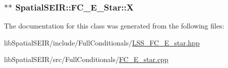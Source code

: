 \hypertarget{classSpatialSEIR_1_1FC__E__Star_adbf6bb013ffffb641ab5bf08a86543d1}{
\subsubsection[{X}]{$\ast$$\ast$ Spatial\-S\-E\-I\-R\-::\-F\-C\-\_\-\-E\-\_\-\-Star\-::\-X}}\label{classSpatialSEIR_1_1FC__E__Star_adbf6bb013ffffb641ab5bf08a86543d1}


The documentation for this class was generated from the following files\-:\begin{DoxyCompactItemize}
\item 
lib\-Spatial\-S\-E\-I\-R/include/\-Full\-Conditionals/\hyperlink{LSS__FC__E__star_8hpp}{L\-S\-S\-\_\-\-F\-C\-\_\-\-E\-\_\-star.\-hpp}\item 
lib\-Spatial\-S\-E\-I\-R/src/\-Full\-Conditionals/\hyperlink{FC__E__star_8cpp}{F\-C\-\_\-\-E\-\_\-star.\-cpp}\end{DoxyCompactItemize}
